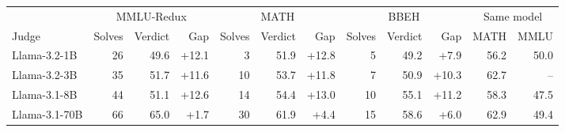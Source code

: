 \begin{tabular}{l rrr rrr rrr rr}
\toprule
& \multicolumn{3}{c}{MMLU-Redux} & \multicolumn{3}{c}{MATH} & \multicolumn{3}{c}{BBEH} & \multicolumn{2}{c}{Same model} \\
\cmidrule(lr){2-4}\cmidrule(lr){5-7}\cmidrule(lr){8-10}\cmidrule(l){11-12}
Judge & Solves & Verdict & Gap & Solves & Verdict & Gap & Solves & Verdict & Gap & MATH & MMLU \\
\midrule
Llama-3.2-1B & 26 & 49.6 & +12.1 & 3 & 51.9 & +12.8 & 5 & 49.2 & +7.9 & 56.2 & 50.0 \\
Llama-3.2-3B & 35 & 51.7 & +11.6 & 10 & 53.7 & +11.8 & 7 & 50.9 & +10.3 & 62.7 & -- \\
Llama-3.1-8B & 44 & 51.1 & +12.6 & 14 & 54.4 & +13.0 & 10 & 55.1 & +11.2 & 58.3 & 47.5 \\
Llama-3.1-70B & 66 & 65.0 & +1.7 & 30 & 61.9 & +4.4 & 15 & 58.6 & +6.0 & 62.9 & 49.4 \\
\bottomrule
\end{tabular}
